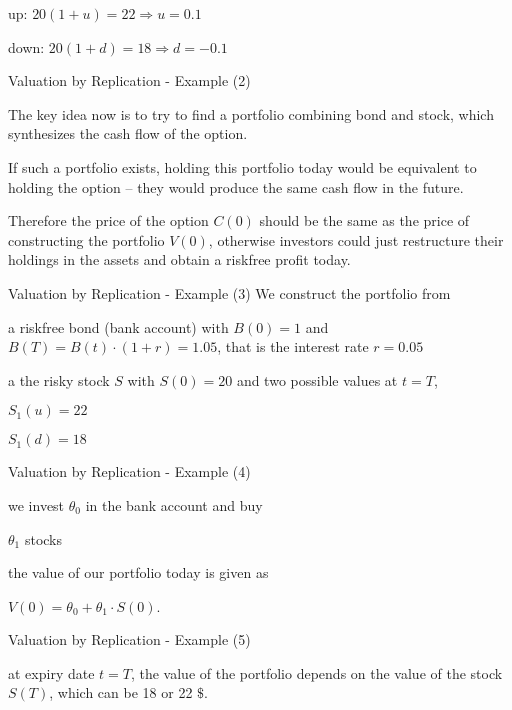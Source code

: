 
	up: $20 (1+u)=22 \Rightarrow u=0.1$

	down: $20 (1+d)=18 \Rightarrow d=-0.1$


{Valuation by Replication - Example (2)}


	The key idea now is to try to find a portfolio combining bond and
stock, which synthesizes the cash flow of the option.

	If such a portfolio exists, holding this portfolio today would be equivalent
to holding the option -- they would produce the same cash flow in
the future.

	Therefore the price of the option $C(0)$ should be the same
as the price of constructing the portfolio $V(0)$, otherwise investors
could just restructure their holdings in the assets and obtain a
riskfree profit today.


{Valuation by Replication - Example (3)}
We construct the portfolio from


	a riskfree bond (bank account) with $B(0)=1$ and $B(T)=B(t) \cdot (1+r) = 1.05$,
that is the interest rate $r=0.05$

	a the risky stock $S$ with $S(0) = 20$ and two
possible values at $t=T$,


	$S_1(u)=22$

	$S_1(d)=18$



{Valuation by Replication - Example (4)}


	we invest $\theta_0$ in the bank account and buy

	$\theta_1$ stocks

	the value of our portfolio today is given as

	$V(0) = \theta_0 + \theta_1 \cdot S(0)$.


{Valuation by Replication - Example (5)}


	at expiry date $t=T$, the value of the portfolio depends on the value of the stock $S(T)$, which can be 18 or 22 $\$$.

